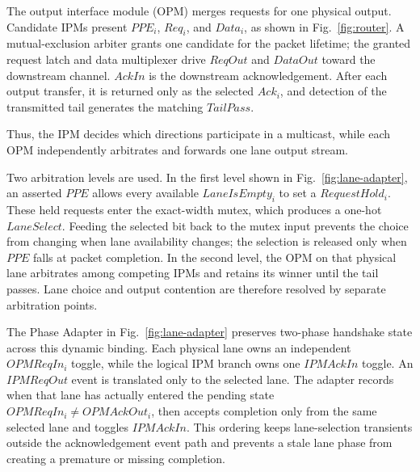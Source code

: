 \documentclass[conference]{IEEEtran}
\begin{document}
The output interface module (OPM) merges requests for one physical output.
Candidate IPMs present \(PPE_i\), \(Req_i\), and \(Data_i\),
as shown in Fig.~\ref{fig:router}. A mutual-exclusion arbiter grants one
candidate for the packet lifetime; the granted request latch and data
multiplexer drive \(ReqOut\) and \(DataOut\) toward the downstream
channel. \(AckIn\) is the downstream acknowledgement. After each output
transfer, it is returned only as the selected \(Ack_i\), and detection of
the transmitted tail generates the matching \(TailPass\).

Thus, the IPM decides which directions participate in a multicast, while
each OPM independently arbitrates and forwards one lane output stream.

Two arbitration levels are used. In the first level shown in
Fig.~\ref{fig:lane-adapter}, an asserted \(PPE\) allows every available
\(LaneIsEmpty_i\) to set a \(RequestHold_i\). These held requests enter
the exact-width mutex, which produces a one-hot \(LaneSelect\). Feeding
the selected bit back to the mutex input prevents the choice from
changing when lane availability changes; the selection is released only
when \(PPE\) falls at packet completion. In the second level, the OPM on
that physical lane arbitrates among competing IPMs and retains its winner
until the tail passes. Lane choice and output contention are therefore
resolved by separate arbitration points.

The Phase Adapter in Fig.~\ref{fig:lane-adapter} preserves two-phase
handshake state across this dynamic binding. Each physical lane owns an
independent \(OPMReqIn_i\) toggle, while the logical IPM branch owns one
\(IPMAckIn\) toggle. An \(IPMReqOut\) event is translated only to the
selected lane. The adapter records when that lane has actually entered
the pending state \(OPMReqIn_i\neq OPMAckOut_i\), then accepts completion
only from the same selected lane and toggles \(IPMAckIn\). This ordering
keeps lane-selection transients outside the acknowledgement event path
and prevents a stale lane phase from creating a premature or missing
completion.

\setcounter{figure}{6}
\par\addvspace{6pt}
\noindent\begin{minipage}{\columnwidth}
\makeatletter{}\makeatother
\centering

\caption{Packet-lifetime lane selection and phase adaptation.}
\label{fig:lane-adapter}
\end{minipage}\par\addvspace{6pt}
\setcounter{figure}{8}
\end{document}
